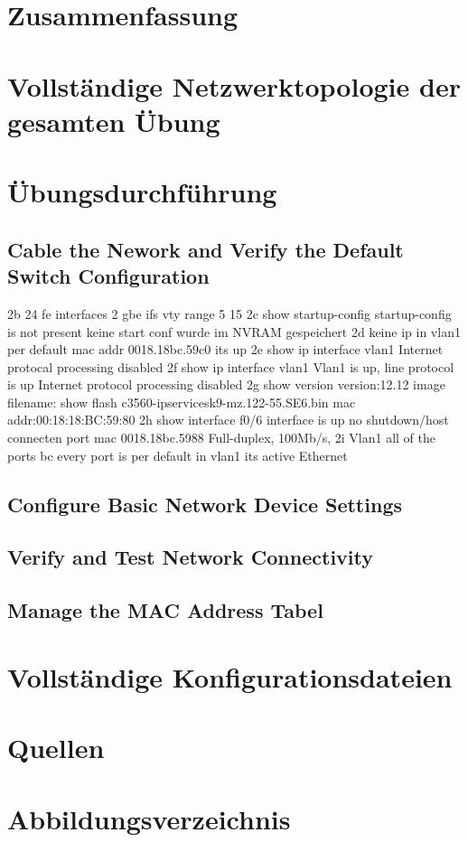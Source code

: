\documentclass[a4paper]{article}
\begin{document}
\section{Zusammenfassung}

\newpage

\section{Vollständige Netzwerktopologie der gesamten Übung}

\newpage

\section{Übungsdurchführung}

\subsection{Cable the Nework and Verify the Default Switch Configuration}
2b
	24 fe interfaces
		2 gbe ifs
		vty range
			5 15
2c 
	show startup-config
	startup-config is not present
	keine start conf wurde im NVRAM gespeichert
2d 
	keine ip in vlan1 per default
	mac addr
	0018.18bc.59c0
	its up
2e	
	show ip interface vlan1
	Internet protocal processing disabled
2f
	show ip interface vlan1
	Vlan1 is up, line protocol is up
	Internet protocol processing disabled
2g
	show version
	version:12.12
	image filename:
	show flash
	c3560-ipservicesk9-mz.122-55.SE6.bin
	mac addr:00:18:18:BC:59:80
2h
	show interface f0/6
	interface is up
	no shutdown/host connecten
	port mac 0018.18bc.5988
	Full-duplex, 100Mb/s,
2i
	Vlan1
	all of the ports bc every port is per default in vlan1
	its active
	Ethernet

\subsection{Configure Basic Network Device Settings}

\subsection{Verify and Test Network Connectivity}

\subsection{Manage the MAC Address Tabel}

\newpage

\section{Vollständige Konfigurationsdateien}

\newpage

\section{Quellen}

\newpage
\section{Abbildungsverzeichnis}

\listoffigures
\end{document}
